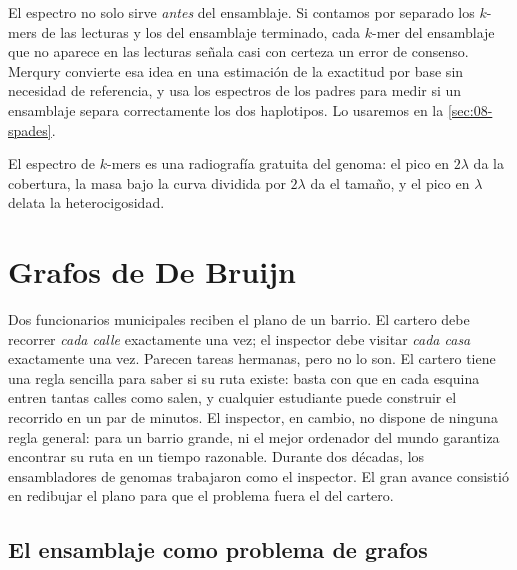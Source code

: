 \begin{profundizacion}
El espectro no solo sirve \emph{antes} del ensamblaje. Si contamos por separado los $k$-mers de las lecturas y los del ensamblaje terminado, cada $k$-mer del ensamblaje que no aparece en las lecturas señala casi con certeza un error de consenso. Merqury \parencite{c08-rhie2020} convierte esa idea en una estimación de la exactitud por base sin necesidad de referencia, y usa los espectros de los padres para medir si un ensamblaje separa correctamente los dos haplotipos. Lo usaremos en la \cref{sec:08-spades}.
\end{profundizacion}

\begin{ideaclave}
El espectro de $k$-mers es una radiografía gratuita del genoma: el pico en $2\lambda$ da la cobertura, la masa bajo la curva dividida por $2\lambda$ da el tamaño, y el pico en $\lambda$ delata la heterocigosidad.
\end{ideaclave}

\section{Grafos de De Bruijn}\label{sec:08-debruijn}

\begin{intuicion}
Dos funcionarios municipales reciben el plano de un barrio. El cartero debe recorrer \emph{cada calle} exactamente una vez; el inspector debe visitar \emph{cada casa} exactamente una vez. Parecen tareas hermanas, pero no lo son. El cartero tiene una regla sencilla para saber si su ruta existe: basta con que en cada esquina entren tantas calles como salen, y cualquier estudiante puede construir el recorrido en un par de minutos. El inspector, en cambio, no dispone de ninguna regla general: para un barrio grande, ni el mejor ordenador del mundo garantiza encontrar su ruta en un tiempo razonable. Durante dos décadas, los ensambladores de genomas trabajaron como el inspector. El gran avance consistió en redibujar el plano para que el problema fuera el del cartero.
\end{intuicion}

\subsection{El ensamblaje como problema de grafos}


